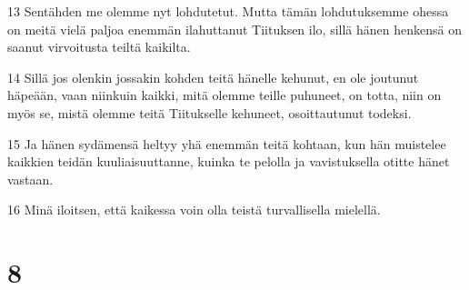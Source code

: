 \par 13 Sentähden me olemme nyt lohdutetut. Mutta tämän lohdutuksemme ohessa on meitä vielä paljoa enemmän ilahuttanut Tiituksen ilo, sillä hänen henkensä on saanut virvoitusta teiltä kaikilta.
\par 14 Sillä jos olenkin jossakin kohden teitä hänelle kehunut, en ole joutunut häpeään, vaan niinkuin kaikki, mitä olemme teille puhuneet, on totta, niin on myös se, mistä olemme teitä Tiitukselle kehuneet, osoittautunut todeksi.
\par 15 Ja hänen sydämensä heltyy yhä enemmän teitä kohtaan, kun hän muistelee kaikkien teidän kuuliaisuuttanne, kuinka te pelolla ja vavistuksella otitte hänet vastaan.
\par 16 Minä iloitsen, että kaikessa voin olla teistä turvallisella mielellä.

\chapter{8}

